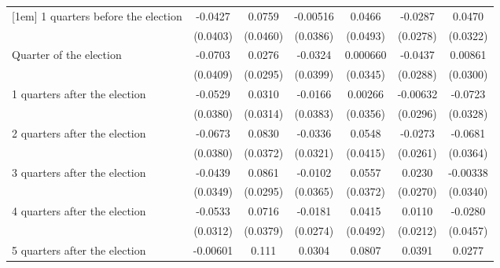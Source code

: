 \begin{table}[htbp]
\begin{tabular}{l*{6}{c}}
[1em]
 1 quarters before the election&     -0.0427         &      0.0759         &    -0.00516         &      0.0466         &     -0.0287         &      0.0470         \\
                    &    (0.0403)         &    (0.0460)         &    (0.0386)         &    (0.0493)         &    (0.0278)         &    (0.0322)         \\
[1em]
Quarter of the election&     -0.0703         &      0.0276         &     -0.0324         &    0.000660         &     -0.0437         &     0.00861         \\
                    &    (0.0409)         &    (0.0295)         &    (0.0399)         &    (0.0345)         &    (0.0288)         &    (0.0300)         \\
[1em]
 1 quarters after the election&     -0.0529         &      0.0310         &     -0.0166         &     0.00266         &    -0.00632         &     -0.0723\sym{*}  \\
                    &    (0.0380)         &    (0.0314)         &    (0.0383)         &    (0.0356)         &    (0.0296)         &    (0.0328)         \\
[1em]
 2 quarters after the election&     -0.0673         &      0.0830\sym{*}  &     -0.0336         &      0.0548         &     -0.0273         &     -0.0681         \\
                    &    (0.0380)         &    (0.0372)         &    (0.0321)         &    (0.0415)         &    (0.0261)         &    (0.0364)         \\
[1em]
 3 quarters after the election&     -0.0439         &      0.0861\sym{**} &     -0.0102         &      0.0557         &      0.0230         &    -0.00338         \\
                    &    (0.0349)         &    (0.0295)         &    (0.0365)         &    (0.0372)         &    (0.0270)         &    (0.0340)         \\
[1em]
 4 quarters after the election&     -0.0533         &      0.0716         &     -0.0181         &      0.0415         &      0.0110         &     -0.0280         \\
                    &    (0.0312)         &    (0.0379)         &    (0.0274)         &    (0.0492)         &    (0.0212)         &    (0.0457)         \\
[1em]
 5 quarters after the election&    -0.00601         &       0.111\sym{***}&      0.0304         &      0.0807\sym{*}  &      0.0391         &      0.0277         \\

\end{tabular}
\end{table}
